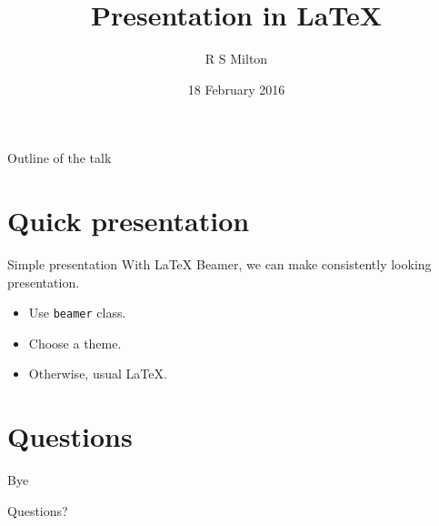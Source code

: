 \documentclass[11pt]{beamer}
\title{Presentation in \LaTeX}
\author{R S Milton}
\institute{
  Department of Computer Science\\
  SSN College of Engineering
}
\date{18 February 2016}
\begin{document}
\begin{frame}
  \titlepage
\end{frame}

\begin{frame}{Outline of the talk}
  \tableofcontents
\end{frame}


\section{Quick presentation}

\begin{frame}{Simple presentation}
  With LaTeX Beamer, we can make consistently looking
  presentation.
  \begin{itemize}
  \item Use \texttt{beamer} class.
  \item Choose a theme.
  \item Otherwise, usual \LaTeX.
  \end{itemize}
\end{frame}

\section{Questions}
\begin{frame}{Bye}
  \vfill
  \begin{center}
    Questions?
  \end{center}
  \vfill
  
\end{frame}
\end{document}
